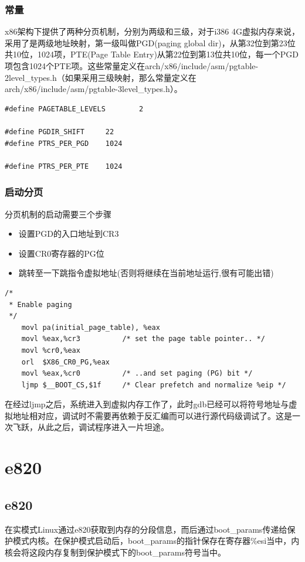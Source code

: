 \documentclass[b5paper,9pt,twoside,openany]{article}
\begin{document}
\subsubsection{常量}
x86架构下提供了两种分页机制，分别为两级和三级，对于i386 4G虚拟内存来说，采用了是两级地址映射，第一级叫做PGD(paging global dir)，从第32位到第23位共10位，1024项，PTE(Page Table Entry)从第22位到第13位共10位，每一个PGD项包含1024个PTE项。这些常量定义在arch/x86/include/asm/pgtable-2level\_types.h（如果采用三级映射，那么常量定义在arch/x86/include/asm/pgtable-3level\_types.h）。
\begin{lstlisting}
#define PAGETABLE_LEVELS        2

#define PGDIR_SHIFT     22
#define PTRS_PER_PGD    1024

#define PTRS_PER_PTE    1024
\end{lstlisting}

\subsubsection{启动分页}
分页机制的启动需要三个步骤
\begin{itemize}
\item 设置PGD的入口地址到CR3
\item 设置CR0寄存器的PG位
\item 跳转至一下跳指令虚拟地址(否则将继续在当前地址运行,很有可能出错)
\end{itemize}
\begin{lstlisting}
/*
 * Enable paging
 */
    movl pa(initial_page_table), %eax
    movl %eax,%cr3          /* set the page table pointer.. */
    movl %cr0,%eax
    orl  $X86_CR0_PG,%eax
    movl %eax,%cr0          /* ..and set paging (PG) bit */
    ljmp $__BOOT_CS,$1f     /* Clear prefetch and normalize %eip */
\end{lstlisting}
在经过ljmp之后，系统进入到虚拟内存工作了，此时gdb已经可以将符号地址与虚拟地址相对应，调试时不需要再依赖于反汇编而可以进行源代码级调试了。这是一次飞跃，从此之后，调试程序进入一片坦途。
\section{e820}
\subsection{e820}
在实模式Linux通过e820获取到内存的分段信息，而后通过boot\_params传递给保护模式内核。在保护模式启动后，boot\_params的指针保存在寄存器\%esi当中，内核会将这段内存复制到保护模式下的boot\_params符号当中。
\end{document}
